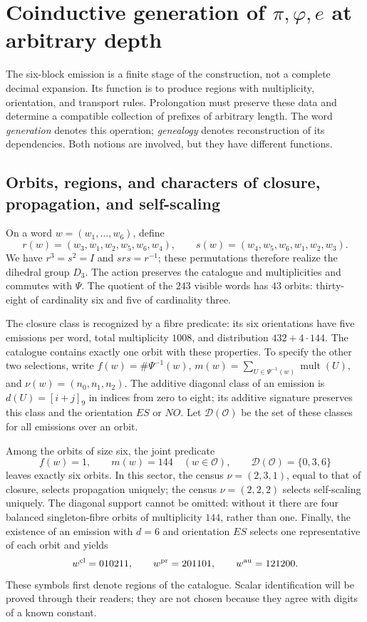 \section{Coinductive generation of \texorpdfstring{\(\pi,\varphi,e\)}{pi, phi, e} at arbitrary depth}
\label{sec:generacion}

The six-block emission is a finite stage of the construction, not a complete decimal expansion. Its function is to produce regions with multiplicity, orientation, and transport rules. Prolongation must preserve these data and determine a compatible collection of prefixes of arbitrary length. The word \emph{generation} denotes this operation; \emph{genealogy} denotes reconstruction of its dependencies. Both notions are involved, but they have different functions.

\subsection{Orbits, regions, and characters of closure, propagation, and self-scaling}

On a word \(w=(w_1,\ldots,w_6)\), define
\[
 r(w)=(w_3,w_1,w_2,w_5,w_6,w_4),\qquad
 s(w)=(w_4,w_5,w_6,w_1,w_2,w_3).
\]
We have \(r^3=s^2=I\) and \(srs=r^{-1}\); these permutations therefore realize the dihedral group \(D_3\). The action preserves the catalogue and multiplicities and commutes with \(\Psi\). The quotient of the \(243\) visible words has \(43\) orbits: thirty-eight of cardinality six and five of cardinality three.

The closure class is recognized by a fibre predicate: its six orientations have five emissions per word, total multiplicity \(1008\), and distribution \(432+4\cdot144\). The catalogue contains exactly one orbit with these properties. To specify the other two selections, write \(f(w)=\#\Psi^{-1}(w)\), \(m(w)=\sum_{U\in\Psi^{-1}(w)}\operatorname{mult}(U)\), and \(\nu(w)=(n_0,n_1,n_2)\). The additive diagonal class of an emission is \(d(U)=[i+j]_9\) in indices from zero to eight; its additive signature preserves this class and the orientation \(ES\) or \(NO\). Let \(\mathcal D(\mathcal O)\) be the set of these classes for all emissions over an orbit.

Among the orbits of size six, the joint predicate
\[
 f(w)=1,\qquad m(w)=144\quad(w\in\mathcal O),\qquad
 \mathcal D(\mathcal O)=\{0,3,6\}
\]
leaves exactly six orbits. In this sector, the census \(\nu=(2,3,1)\), equal to that of closure, selects propagation uniquely; the census \(\nu=(2,2,2)\) selects self-scaling uniquely. The diagonal support cannot be omitted: without it there are four balanced singleton-fibre orbits of multiplicity \(144\), rather than one. Finally, the existence of an emission with \(d=6\) and orientation \(ES\) selects one representative of each orbit and yields
\begin{equation}
 w^{\rm cl}=010211,\qquad w^{\rm pr}=201101,\qquad w^{\rm au}=121200.
 \label{eq:palabras-regionales}
\end{equation}
These symbols first denote regions of the catalogue. Scalar identification will be proved through their readers; they are not chosen because they agree with digits of a known constant.

